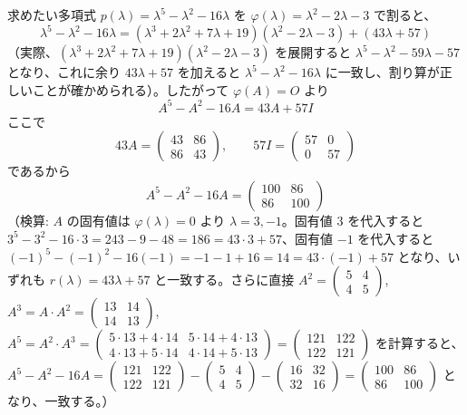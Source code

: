 \documentclass[a4paper,11pt]{article}
\begin{document}
求めたい多項式 $p(\lambda) = \lambda^{5} - \lambda^{2} - 16\lambda$ を $\varphi(\lambda) = \lambda^{2} - 2\lambda - 3$ で割ると、
\[
\lambda^{5} - \lambda^{2} - 16\lambda = (\lambda^{3} + 2\lambda^{2} + 7\lambda + 19)(\lambda^{2} - 2\lambda - 3) + (43\lambda + 57)
\]
（実際、$(\lambda^{3}+2\lambda^{2}+7\lambda+19)(\lambda^{2}-2\lambda-3)$ を展開すると $\lambda^{5} - \lambda^{2} - 59\lambda - 57$ となり、これに余り $43\lambda+57$ を加えると $\lambda^{5} - \lambda^{2} - 16\lambda$ に一致し、割り算が正しいことが確かめられる）。したがって $\varphi(A) = O$ より
\[
A^{5} - A^{2} - 16A = 43A + 57I
\]
ここで
\[
43A = \begin{pmatrix} 43 & 86 \\ 86 & 43 \end{pmatrix}, \qquad 57I = \begin{pmatrix} 57 & 0 \\ 0 & 57 \end{pmatrix}
\]
であるから
\[
\boxed{\; A^{5} - A^{2} - 16A = \begin{pmatrix} 100 & 86 \\ 86 & 100 \end{pmatrix} \;}
\]
（検算: $A$ の固有値は $\varphi(\lambda)=0$ より $\lambda = 3, -1$。固有値 $3$ を代入すると $3^{5} - 3^{2} - 16\cdot 3 = 243 - 9 - 48 = 186 = 43\cdot 3 + 57$、固有値 $-1$ を代入すると $(-1)^{5} - (-1)^{2} - 16(-1) = -1 - 1 + 16 = 14 = 43\cdot(-1)+57$ となり、いずれも $r(\lambda) = 43\lambda+57$ と一致する。さらに直接 $A^{2} = \begin{pmatrix}5&4\\4&5\end{pmatrix}$, $A^{3}=A\cdot A^2=\begin{pmatrix}13&14\\14&13\end{pmatrix}$, $A^{5}=A^{2}\cdot A^{3}=\begin{pmatrix}5\cdot13+4\cdot14 & 5\cdot14+4\cdot13\\ 4\cdot13+5\cdot14 & 4\cdot14+5\cdot13\end{pmatrix}=\begin{pmatrix}121&122\\122&121\end{pmatrix}$ を計算すると、$A^{5}-A^{2}-16A = \begin{pmatrix}121&122\\122&121\end{pmatrix} - \begin{pmatrix}5&4\\4&5\end{pmatrix} - \begin{pmatrix}16&32\\32&16\end{pmatrix} = \begin{pmatrix}100&86\\86&100\end{pmatrix}$ となり、一致する。）
\end{document}
